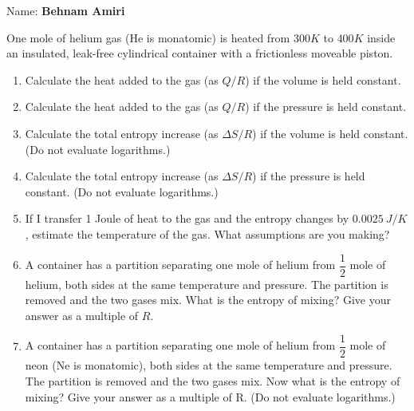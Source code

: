 \documentclass[fleqn]{article}
\begin{document}
  Name: \textbf{Behnam Amiri}

  \vspace{1cm}

  One mole of helium gas (He is monatomic) is heated from $300K$ to $400K$ inside an insulated, leak-free 
  cylindrical container with a frictionless moveable piston.

  \begin{enumerate}
    \item Calculate the heat added to the gas (as $Q/R$) if the volume is held constant.


    \item Calculate the heat added to the gas (as $Q/R$) if the pressure is held constant.


    \item Calculate the total entropy increase (as $\Delta S/R$) if the volume is held constant. (Do not evaluate
    logarithms.)


    \item Calculate the total entropy increase (as $\Delta S/R$) if the pressure is held constant. (Do not evaluate
    logarithms.)


    \item If I transfer 1 Joule of heat to the gas and the entropy changes by $0.0025 ~ J/K$, estimate the
    temperature of the gas. What assumptions are you making?


    \item A container has a partition separating one mole of helium from $\dfrac{1}{2}$ mole of helium, both sides at
    the same temperature and pressure. The partition is removed and the two gases mix. What is the entropy of 
    mixing? Give your answer as a multiple of $R$.


    \item A container has a partition separating one mole of helium from $\dfrac{1}{2}$ mole of neon 
    (Ne is monatomic), both sides at the same temperature and pressure. The partition is removed and 
    the two gases mix. Now what is the entropy of mixing? Give your answer as a multiple of R. (Do not evaluate
    logarithms.)


  \end{enumerate}
\end{document}
